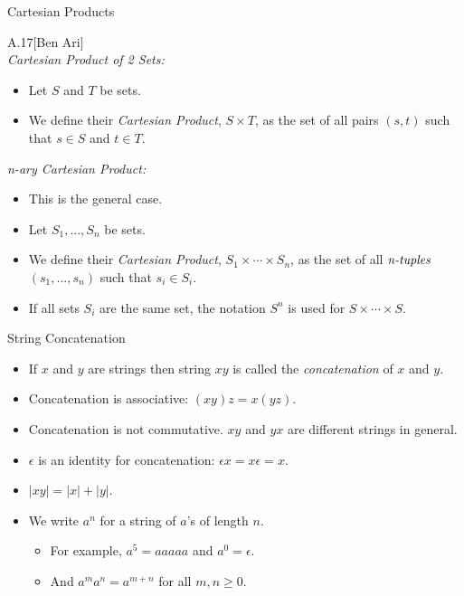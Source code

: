 \documentclass[style=sailor,size=12pt]{powerdot}
\begin{document}
\begin{slide}[bm=,toc=]{Cartesian Products}
\begin{defn}{A.17}[Ben Ari]
~\\
\emph{Cartesian Product of 2 Sets:}
\begin{itemize}
\item Let $S$ and $T$ be sets.
\item We define their \emph{Cartesian Product}, $S \times T$, as the set of all
pairs $(s,t)$ such that $s \in S$ and $t \in T$.
\end{itemize}
\emph{n-ary Cartesian Product:}
\begin{itemize}
\item This is the general case.
\item Let $S_1,...,S_n$ be sets.
\item We define their \emph{Cartesian Product}, $S_1 \times \cdots \times S_n$, as the set of all
$\emph{n-tuples}$ $(s_1,...,s_n)$ such that $s_i \in S_i$.
\item If all sets $S_i$ are the same set, the notation $S^n$ is used for $S
\times \cdots \times S$.
\end{itemize}
\end{defn}
\end{slide}

\begin{slide}[bm=,toc=]{String Concatenation}

\begin{itemize}
    \item If $x$ and $y$ are strings then string $xy$ is called the
    \emph{concatenation} of $x$ and $y$.
    \item Concatenation is associative: $(xy)z = x(yz)$. 
    \item Concatenation is not commutative. $xy$ and $yx$ are different strings
    in general.
    \item $\epsilon$ is an identity for concatenation: ${\epsilon}x = x\epsilon = x$. 
    \item $|xy| = |x| + |y|$. 
    \item We write $a^n$ for a string of $a$'s of length $n$.
    \begin{itemize}
        \item For example, $a^5 = aaaaa$ and $a^0 = \epsilon$. 
        \item And $a^ma^n = a^{m+n}$ for all $m,n \geq 0.$
    \end{itemize} 
\end{itemize} 
\end{slide}
\end{document}
